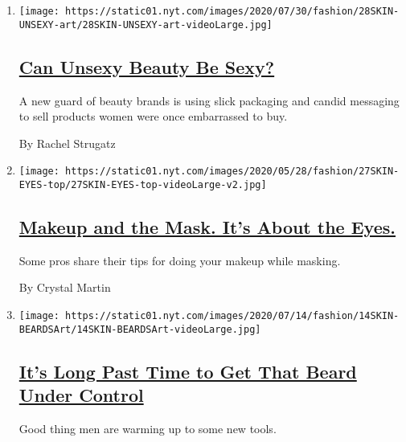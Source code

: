 \begin{enumerate}
\def\labelenumi{\arabic{enumi}.}
\item
  \texttt{[image: https://static01.nyt.com/images/2020/07/30/fashion/28SKIN-UNSEXY-art/28SKIN-UNSEXY-art-videoLarge.jpg]}

  \hypertarget{can-unsexy-beauty-be-sexy}{%
  \subsection{\texorpdfstring{\href{/2020/07/28/style/can-unsexy-beauty-be-sexy.html}{Can
  Unsexy Beauty Be
  Sexy?}}{Can Unsexy Beauty Be Sexy?}}\label{can-unsexy-beauty-be-sexy}}

  A new guard of beauty brands is using slick packaging and candid
  messaging to sell products women were once embarrassed to buy.

  By Rachel Strugatz
\item
  \texttt{[image: https://static01.nyt.com/images/2020/05/28/fashion/27SKIN-EYES-top/27SKIN-EYES-top-videoLarge-v2.jpg]}

  \hypertarget{makeup-and-the-mask-its-about-the-eyes}{%
  \subsection{\texorpdfstring{\href{/2020/05/26/style/makeup-and-the-mask-its-about-the-eyes.html}{Makeup
  and the Mask. It's About the
  Eyes.}}{Makeup and the Mask. It's About the Eyes.}}\label{makeup-and-the-mask-its-about-the-eyes}}

  Some pros share their tips for doing your makeup while masking.

  By Crystal Martin
\item
  \texttt{[image: https://static01.nyt.com/images/2020/07/14/fashion/14SKIN-BEARDSArt/14SKIN-BEARDSArt-videoLarge.jpg]}

  \hypertarget{its-long-past-time-to-get-that-beard-under-control}{%
  \subsection{\texorpdfstring{\href{/2020/07/15/style/its-long-past-time-to-get-that-beard-under-control.html}{It's
  Long Past Time to Get That Beard Under
  Control}}{It's Long Past Time to Get That Beard Under Control}}\label{its-long-past-time-to-get-that-beard-under-control}}

  Good thing men are warming up to some new tools.


\end{enumerate}
